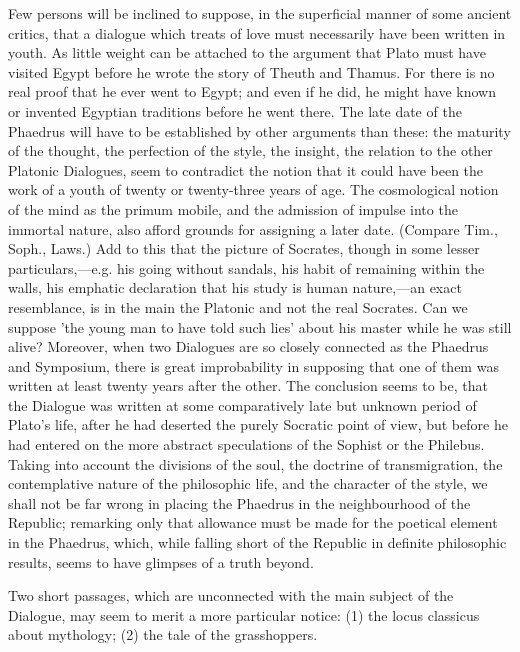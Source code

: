 \documentclass[11pt,letter]{article}
\begin{document}
\par  Few persons will be inclined to suppose, in the superficial manner of some ancient critics, that a dialogue which treats of love must necessarily have been written in youth. As little weight can be attached to the argument that Plato must have visited Egypt before he wrote the story of Theuth and Thamus. For there is no real proof that he ever went to Egypt; and even if he did, he might have known or invented Egyptian traditions before he went there. The late date of the Phaedrus will have to be established by other arguments than these: the maturity of the thought, the perfection of the style, the insight, the relation to the other Platonic Dialogues, seem to contradict the notion that it could have been the work of a youth of twenty or twenty-three years of age. The cosmological notion of the mind as the primum mobile, and the admission of impulse into the immortal nature, also afford grounds for assigning a later date. (Compare Tim., Soph., Laws.) Add to this that the picture of Socrates, though in some lesser particulars,—e.g. his going without sandals, his habit of remaining within the walls, his emphatic declaration that his study is human nature,—an exact resemblance, is in the main the Platonic and not the real Socrates. Can we suppose 'the young man to have told such lies' about his master while he was still alive? Moreover, when two Dialogues are so closely connected as the Phaedrus and Symposium, there is great improbability in supposing that one of them was written at least twenty years after the other. The conclusion seems to be, that the Dialogue was written at some comparatively late but unknown period of Plato's life, after he had deserted the purely Socratic point of view, but before he had entered on the more abstract speculations of the Sophist or the Philebus. Taking into account the divisions of the soul, the doctrine of transmigration, the contemplative nature of the philosophic life, and the character of the style, we shall not be far wrong in placing the Phaedrus in the neighbourhood of the Republic; remarking only that allowance must be made for the poetical element in the Phaedrus, which, while falling short of the Republic in definite philosophic results, seems to have glimpses of a truth beyond.

\par  Two short passages, which are unconnected with the main subject of the Dialogue, may seem to merit a more particular notice: (1) the locus classicus about mythology; (2) the tale of the grasshoppers.
\end{document}
